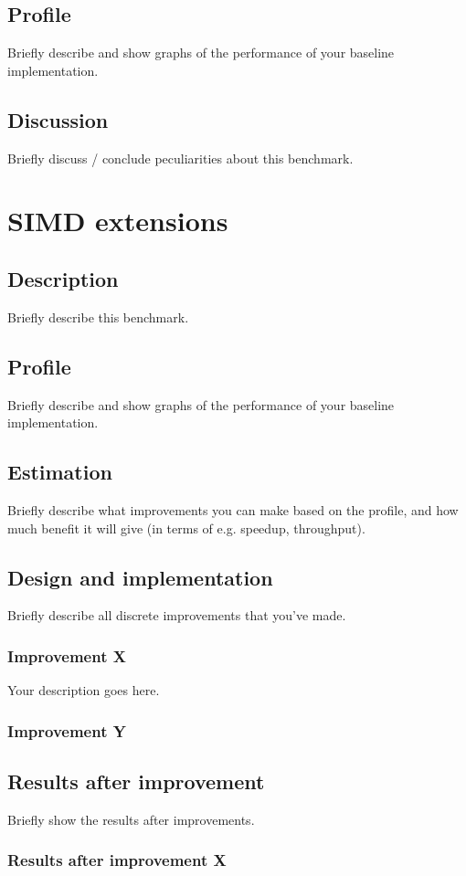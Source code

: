 \documentclass[twocolumn]{article}
\begin{document}
\subsection{Profile}
Briefly describe and show graphs of the performance of your baseline implementation.
\subsection{Discussion}
Briefly discuss / conclude peculiarities about this benchmark.

\section{SIMD extensions}
\subsection{Description}
Briefly describe this benchmark.
\subsection{Profile}
Briefly describe and show graphs of the performance of your baseline implementation.
\subsection{Estimation}
Briefly describe what improvements you can make based on the profile, and how much benefit it will give (in terms of e.g. speedup, throughput).
\subsection{Design and implementation}
Briefly describe all discrete improvements that you've made.
\subsubsection{Improvement X}
Your description goes here.
\subsubsection{Improvement Y}
\subsection{Results after improvement}
Briefly show the results after improvements.
\subsubsection{Results after improvement X}
\end{document}
